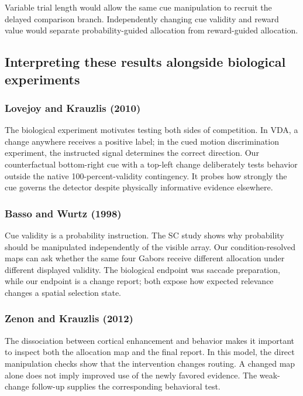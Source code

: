 \documentclass[11pt]{article}
\begin{document}
Variable trial length would allow the same cue manipulation to recruit the delayed comparison branch. Independently changing cue validity and reward value would separate probability-guided allocation from reward-guided allocation.

\subsection{Interpreting these results alongside biological experiments}
\subsubsection{Lovejoy and Krauzlis (2010)}
The biological experiment motivates testing both sides of competition. In VDA, a change anywhere receives a positive label; in the cued motion discrimination experiment, the instructed signal determines the correct direction. Our counterfactual bottom-right cue with a top-left change deliberately tests behavior outside the native 100-percent-validity contingency. It probes how strongly the cue governs the detector despite physically informative evidence elsewhere. \cite{bio_lovejoy}

\subsubsection{Basso and Wurtz (1998)}
Cue validity is a probability instruction. The SC study shows why probability should be manipulated independently of the visible array. Our condition-resolved maps can ask whether the same four Gabors receive different allocation under different displayed validity. The biological endpoint was saccade preparation, while our endpoint is a change report; both expose how expected relevance changes a spatial selection state. \cite{bio_basso}

\subsubsection{Zenon and Krauzlis (2012)}
The dissociation between cortical enhancement and behavior makes it important to inspect both the allocation map and the final report. In this model, the direct manipulation checks show that the intervention changes routing. A changed map alone does not imply improved use of the newly favored evidence. The weak-change follow-up supplies the corresponding behavioral test. \cite{bio_zenon}
\end{document}

